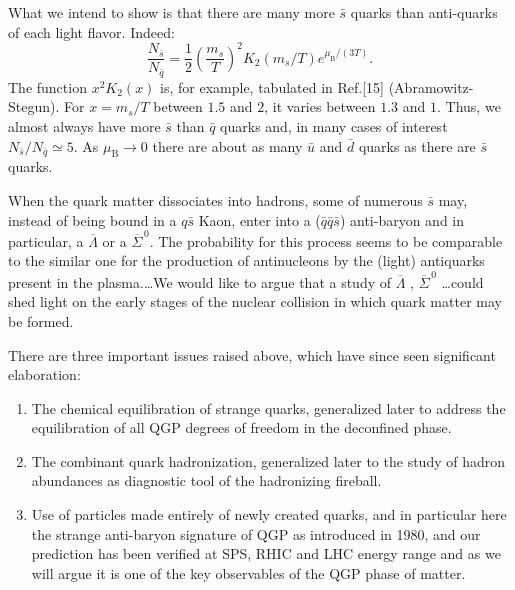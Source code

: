 \begin{mdframed}[linecolor=gray,roundcorner=12pt,backgroundcolor=Dandelion!15,linewidth=1pt,leftmargin=0cm,rightmargin=0cm,topline=true,bottomline=true,skipabove=12pt]
What we intend to show is that there are many more $\bar s$ quarks than anti-quarks of each light flavor. Indeed:
\begin{equation}\label{Eq3}\tag{28}
\frac{N_{\bar s}}{N_{\bar q}}=\frac 1 2 \left( \frac{ m_s}{T}\right)^2K_2(m_s/T)e^{\mu_\mathrm{B}/(3T)}.
\end{equation}
The function $x^2K_2(x)$ is, for example, tabulated in Ref.[15] (Abramowitz-Stegun). For $x=m_s/T$ between $1.5$ and $2$, it varies between $1.3$ and $1$. Thus, we almost always have more $\bar s$ than $\bar q$ quarks and, in many cases of interest $N_{\bar s}/N_{\bar q}\simeq 5$. As $\mu_\mathrm{B}\to 0$ there are about as many $\bar u$ and $\bar d$ quarks as there are $\bar s$ quarks. 

\label{FirstPredict}
When the quark matter dissociates into hadrons, some of numerous $\bar s$ may, instead of being bound in a $q\bar s$ Kaon, enter into a ($\bar q \bar q \bar s$) anti-baryon and in particular, a $\overline{\Lambda}$ or a $\overline{\Sigma}^{\,0}$. The probability for this process seems to be comparable to the similar one for the production of antinucleons by the (light) antiquarks present in the plasma.\ldots We would like to argue that a study of $\overline{\Lambda}$ , $\overline{\Sigma}^{\,0}$ \ldots could shed light on the early stages of the nuclear collision in which quark matter may be formed.
%
\end{mdframed}
\vskip 0.5cm

There are three important issues raised above, which have since seen significant elaboration:
\begin{enumerate}
\item 
The chemical equilibration of strange quarks, generalized later to address the equilibration of all QGP degrees of freedom in the deconfined phase. 
\item 
The combinant quark hadronization, generalized later to the study of hadron abundances as diagnostic tool of the hadronizing fireball.
\item 
Use of particles made entirely of newly created quarks, and in particular here the strange anti-baryon signature of QGP as introduced in 1980, and our prediction has been verified at SPS, RHIC and LHC energy range and as we will argue it is one of the key observables of the QGP phase of matter. 
\end{enumerate}

